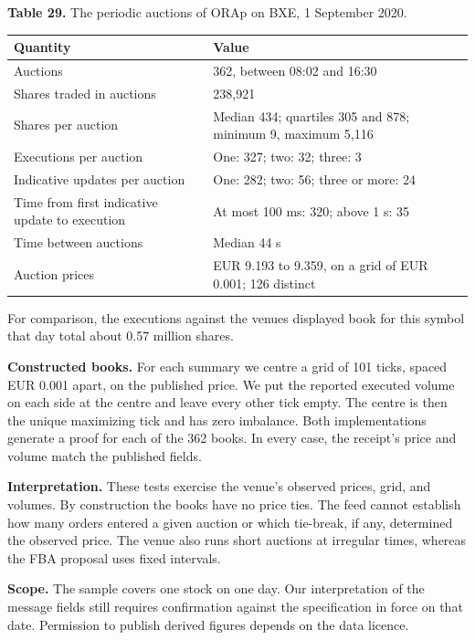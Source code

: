 \textbf{Table 29.} The periodic auctions of ORAp on BXE, 1 September 2020.

\begin{longtable}[]{@{}ll@{}}
\toprule\noalign{}
Quantity & Value \\
\midrule\noalign{}
\endhead
\bottomrule\noalign{}
\endlastfoot
Auctions & 362, between 08:02 and 16:30 \\
Shares traded in auctions & 238,921 \\
Shares per auction & Median 434; quartiles 305 and 878; minimum 9, maximum 5,116 \\
Executions per auction & One: 327; two: 32; three: 3 \\
Indicative updates per auction & One: 282; two: 56; three or more: 24 \\
Time from first indicative update to execution & At most 100 ms: 320; above 1 s: 35 \\
Time between auctions & Median 44 s \\
Auction prices & EUR 9.193 to 9.359, on a grid of EUR 0.001; 126 distinct \\
\end{longtable}

For comparison, the executions against the venue\textquotesingle s displayed book for this symbol that day total about 0.57 million shares.

\textbf{Constructed books.} For each summary we centre a grid of 101 ticks, spaced EUR 0.001 apart, on the published price. We put the reported executed volume on each side at the centre and leave every other tick empty. The centre is then the unique maximizing tick and has zero imbalance. Both implementations generate a proof for each of the 362 books. In every case, the receipt's price and volume match the published fields.

\textbf{Interpretation.} These tests exercise the venue's observed prices, grid, and volumes. By construction the books have no price ties. The feed cannot establish how many orders entered a given auction or which tie-break, if any, determined the observed price. The venue also runs short auctions at irregular times, whereas the FBA proposal uses fixed intervals.

\textbf{Scope.} The sample covers one stock on one day. Our interpretation of the message fields still requires confirmation against the specification in force on that date. Permission to publish derived figures depends on the data licence.
